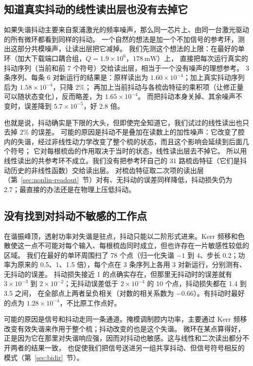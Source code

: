 \subsection{知道真实抖动的线性读出层也没有去掉它}\label{sec:reference}

如果失谐抖动主要来自泵浦激光的频率噪声，那么同一芯片上、由同一台激光驱动的所有微环都看到同样的抖动。
一个自然的想法是加一个不加信号的参考环，测出这部分共模噪声，让读出层把它减掉。
我们先测这个想法的上限：在最好的单环（加大下载端口耦合组，$Q=1.9\times10^{6}$，$178~\mathrm{mW}$）上，
直接把每次运行真实的抖动序列（当前和前 7 个符号）交给读出层，相当于一个没有噪声的理想参考。
3 条序列、每条 6 对新运行的结果是：原样读出为 $1.60\times10^{-4}$；加上真实抖动序列后为 $1.58\times10^{-4}$，只降 2\%；
再加上当前抖动与各梳齿特征的乘积项（让修正量可以随状态变化），反而略差，为 $1.65\times10^{-4}$。
而把抖动本身关掉、其余噪声不变时，误差降到 $5.7\times10^{-5}$，好 2.8 倍。

也就是说，抖动确实是下限的大头，但即使完全知道它，我们试过的线性读出也只去掉 2\% 的误差。
可能的原因是抖动不是叠加在读数上的加性噪声：它改变了腔内的失谐，经过非线性动力学改变了整个梳的状态，而且这个影响会延续到后面几个符号；
它对每根梳齿的作用取决于当时的状态，线性读出层去不掉它。
所以用线性读出的共参考环不成立。我们没有把参考环自己的 31 路梳齿特征（它们是抖动历史的非线性函数）交给读出层。
对梳齿特征取二次项的读出层（第~\ref{sec:nonlin-readout}~节）对有、无抖动的误差同样降低，抖动损失仍为 2.7；最直接的办法还是在物理上压低抖动。

\subsection{没有找到对抖动不敏感的工作点}\label{sec:sweetspot}

在谐振峰顶，透射功率对失谐是驻点，抖动只能以二阶形式进来。Kerr 频移和色散使这一点不可能对每个输入、每根梳齿同时成立，但也许存在一片敏感性较低的区域。
我们在最好的单环周围扫了 78 个点（归一化失谐 $-1$ 到 $4$、步长 $0.2$；功率为原来的 0.5、1、1.5 倍），每个点在 3 条序列上各用 3 对新运行，分别测有、无抖动的误差。
抖动损失接近 1 的点确实存在，但那里无抖动时的误差就有 $3\times10^{-3}$ 到 $2\times10^{-2}$；无抖动误差低于 $2\times10^{-4}$ 的 10 个点，抖动损失都在 1.4 到 3.5 之间，
在全部点上两者呈负相关（对数的相关系数为 $-0.66$）。有抖动时最好的点为 $1.28\times10^{-4}$，不比原工作点好。

可能的原因是信号和抖动走同一条通道。掩模调制腔内功率，主要通过 Kerr 频移改变有效失谐来作用于整个梳；抖动改变的也是这个失谐。
微环在某点算得好，正是因为它在那里对失谐响应强，因而对抖动也敏感。这与线性和二次读出都分不开两者的结果一致，
也促使我们把信号送进另一组共享抖动、但信号符号相反的模式（第~\ref{sec:bidir}~节）。


